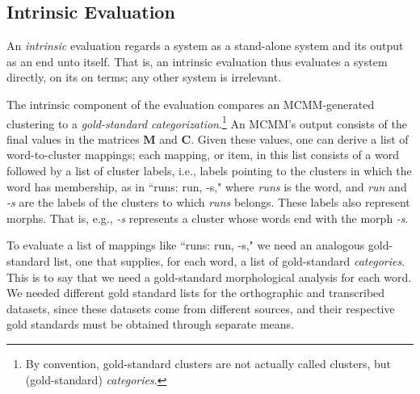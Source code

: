 \subsection{Intrinsic Evaluation}
An \emph{intrinsic} evaluation regards a system as a stand-alone system and its output as an end unto itself. That is, an intrinsic evaluation thus evaluates a system directly, on its on terms; any other system is irrelevant. 

The intrinsic component of the evaluation compares an MCMM-generated clustering to a 
\emph{gold-standard categorization}.\footnote{By convention, 
gold-standard clusters are not actually called clusters, 
but (gold-standard) \emph{categories}.} 
An MCMM's output consists of 
the final values in the matrices $\mathbf{M}$ and $\mathbf{C}$.
Given these values, one can derive a list of word-to-cluster mappings; 
each mapping, or item, in this list
consists of a word followed by a list of cluster labels, i.e., labels pointing to
the clusters in which the word has membership, 
as in ``runs: run, -s,"  where \textit{runs} is the word, and \textit{run} and \textit{-s} 
are the labels of the clusters to which \textit{runs} belongs. These labels also represent 
morphs. That is, e.g., \emph{-s} represents a cluster whose words end with the morph 
\emph{-s}.

To evaluate a list of mappings like ``runs: run, -s," we need an analogous 
gold-standard list, one that supplies, for each word, a list of gold-standard \emph{categories}.
This is to say that we need a gold-standard morphological analysis for each word. 
We needed different gold standard lists for the orthographic and transcribed datasets, 
since these datasets come from different sources, and their respective gold standards must 
be obtained through separate means.


 
